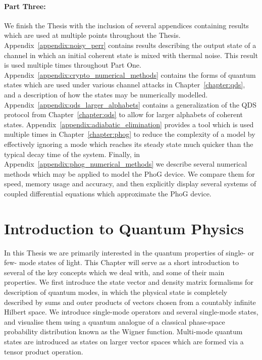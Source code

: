 \paragraph{Part Three:} We finish the Thesis with the inclusion of several appendices containing results which are used at multiple points throughout the Thesis.  Appendix~\ref{appendix:noisy_perr} contains results describing the output state of a channel in which an initial coherent state is mixed with thermal noise. This result is used multiple times throughout Part One. Appendix~\ref{appendix:crypto_numerical_methods} contains the forms of quantum states which are used under various channel attacks in Chapter~\ref{chapter:qds}, and a description of how the states may be numerically modelled. Appendix~\ref{appendix:qds_larger_alphabets} contains a generalization of the QDS protocol from Chapter~\ref{chapter:qds} to allow for larger alphabets of coherent states.  Appendix~\ref{appendix:adiabatic_elimination} provides a tool which is used multiple times in Chapter~\ref{chapter:phog} to reduce the complexity of a model by effectively ignoring a mode which reaches its steady state much quicker than the typical decay time of the system. Finally, in Appendix~\ref{appendix:phog_numerical_methods} we describe several numerical methods which may be applied to model the PhoG device. We compare them for speed, memory usage and accuracy, and then explicitly display several systems of coupled differential equations which approximate the PhoG device. 

\section{Introduction to Quantum Physics}

In this Thesis we are primarily interested in the quantum properties of single- or few- mode states of light. This Chapter will serve as a short introduction to several of the key concepts which we deal with, and some of their main properties. We first introduce the state vector and density matrix formalisms for description of quantum modes, in which the physical state is completely described by sums and outer products of vectors chosen from a countably infinite Hilbert space. We introduce single-mode operators and several single-mode states, and visualise them using a quantum analogue of a classical phase-space probability distribution known as the Wigner function. Multi-mode quantum states are introduced as states on larger vector spaces which are formed via a tensor product operation.

